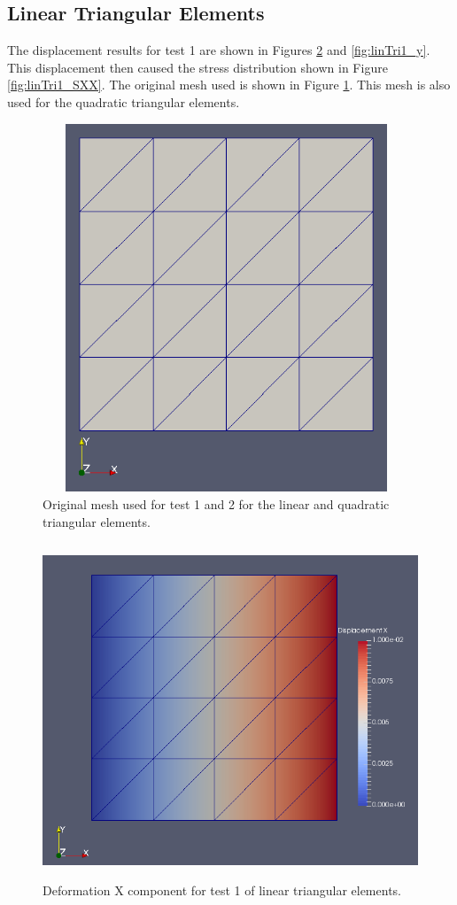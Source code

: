 \documentclass[a4paper, 12pt]{article}
\begin{document}
\subsection{Linear Triangular Elements} \label{subsec:linTris}
The displacement results for test 1 are shown in 
Figures \ref{fig:linTri1_x} and \ref{fig:linTri1_y}.
This displacement then caused the stress distribution 
shown in Figure \ref{fig:linTri1_SXX}.
The original mesh used is shown in Figure \ref{fig:TriMesh}.
This mesh is also used for the quadratic triangular elements.

\begin{figure}[H]
  \centering
  \includegraphics[width=11cm, height=11cm]{tri_4_mesh}
  \caption{Original mesh used for test 1 and 2 for the linear
            and quadratic triangular elements.}
  \label{fig:TriMesh}
\end{figure}

\begin{figure}[H]
  \centering
  \includegraphics[width=13cm, height=10cm]{tri_4_t1_disp_X}
  \caption{Deformation X component for test 1 of linear 
            triangular elements.}
  \label{fig:linTri1_x}
\end{figure}
\end{document}
